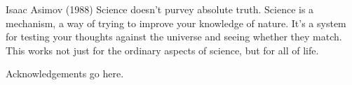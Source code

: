 \begin{wbepi}{Isaac Asimov (1988)}
Science doesn't purvey absolute truth. Science is a mechanism, a way of trying to improve your knowledge of nature. It's a system for testing your thoughts against the universe and seeing whether they match. This works not just for the ordinary aspects of science, but for all of life.
\end{wbepi}

Acknowledgements go here.